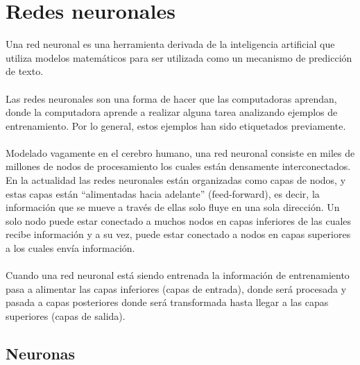\documentclass[12pt, a4paper, titlepage]{report}
\begin{document}
	    \section{Redes neuronales}
	    Una red neuronal es una herramienta derivada de la inteligencia artificial que utiliza modelos matemáticos para ser utilizada como un mecanismo de predicción de texto.\\\\
		Las redes neuronales son una forma de hacer que las computadoras aprendan, donde la computadora aprende a realizar alguna tarea analizando ejemplos de entrenamiento. Por lo general, estos ejemplos han sido etiquetados previamente.\\\\
		Modelado vagamente en el cerebro humano, una red neuronal consiste en miles de millones de nodos de procesamiento los cuales están densamente interconectados. En la actualidad las redes neuronales están organizadas como capas de nodos, y estas capas están “alimentadas hacia adelante” (feed-forward), es decir, la información que se mueve a través de ellas solo fluye en una sola dirección. Un solo nodo puede estar conectado a muchos nodos en capas inferiores de las cuales recibe información y a su vez, puede estar conectado a nodos en capas superiores a los cuales envía información.\\\\
		Cuando una red neuronal está siendo entrenada la información de entrenamiento pasa a alimentar las capas inferiores (capas de entrada), donde será procesada y pasada a capas posteriores donde será transformada hasta llegar a las capas superiores (capas de salida).\cite{refQueSonRedesNeu}

				\subsection{Neuronas}
\end{document}
